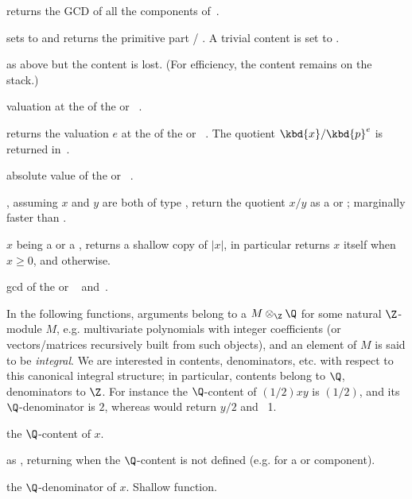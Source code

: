  returns the GCD of all the components of~.

 sets  to 
and returns the primitive part  / . A trivial content is set to
.

 as above but the content is lost.
(For efficiency, the content remains on the stack.)


 valuation at the  
of the  or ~.

 returns the valuation $e$ at the
  of the  or ~. The quotient
$\kbd{x}/\kbd{p}^{e}$ is returned in~.

 absolute value of the  or
~.

, assuming $x$ and $y$
are both of type , return the quotient $x/y$ as a  or
; marginally faster than .

 $x$ being a  or a , returns
a shallow copy of $|x|$, in particular returns $x$ itself when $x \geq 0$, and
 otherwise.

 gcd of the  or ~
and~.
\smallskip

In the following functions, arguments belong to a $M\otimes_\Z\Q$
for some natural $\Z$-module $M$, e.g. multivariate polynomials with integer
coefficients (or vectors/matrices recursively built from such objects), and
an element of $M$ is said to be \emph{integral}.
We are interested in contents, denominators, etc. with respect to this
canonical integral structure; in particular, contents belong to $\Q$,
denominators to $\Z$. For instance the $\Q$-content of $(1/2)xy$ is $(1/2)$,
and its $\Q$-denominator is $2$, whereas  would return $y/2$ and
~1.

 the $\Q$-content of $x$.

 as , returning
 when the $\Q$-content is not defined (e.g. for a 
or  component).

 the $\Q$-denominator of $x$. Shallow function.

